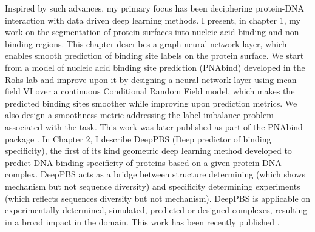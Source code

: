 Inspired by such advances, my primary focus has been deciphering protein-DNA interaction with data driven deep learning methods.  I present, in chapter 1,
my work on the segmentation of protein surfaces into nucleic acid binding and non-binding regions. This chapter describes a graph neural network layer, which enables smooth prediction of binding site labels on the protein surface. We start from a model of nucleic acid binding site prediction (PNAbind) developed in the Rohs lab and improve upon it by designing a neural network layer using mean field VI over a continuous Conditional Random Field model, which makes the predicted binding sites smoother while improving upon prediction metrics. We also design a smoothness metric addressing the label imbalance problem associated with the task. This work was later published as part of the PNAbind package \citep{Sagendorf2024}.
In Chapter 2, I describe DeepPBS (Deep predictor of binding specificity), the first of its kind geometric deep learning method developed to predict DNA binding specificity of proteins based on a given protein-DNA complex. DeepPBS acts as a bridge between structure determining (which shows mechanism but not sequence diversity) and specificity determining experiments (which reflects sequences diversity but not mechanism). DeepPBS is applicable on experimentally determined, simulated, predicted or designed complexes, resulting in a broad impact in the domain. This work has been recently published \citep{Mitra2024}.


